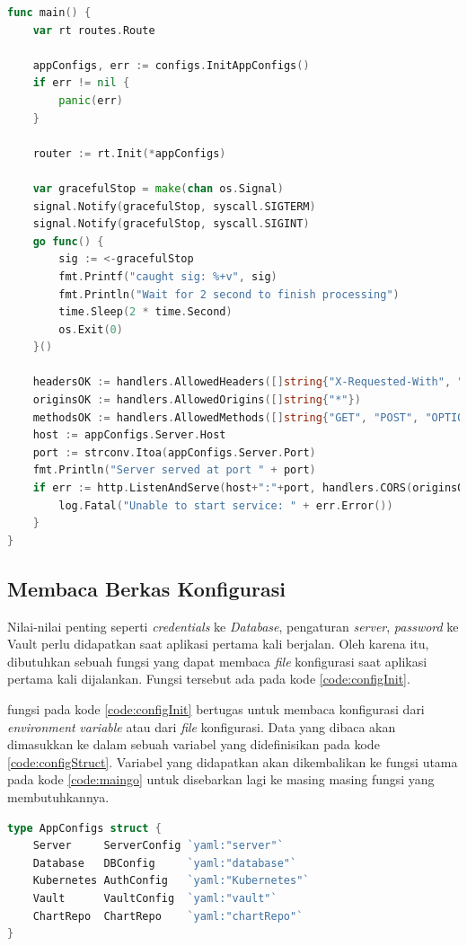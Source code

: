 \begin{lstlisting}[frame=single,language=Go,caption={Kode utama pada aplikasi yang dikembangkan},label={code:maingo}]
func main() {
	var rt routes.Route

	appConfigs, err := configs.InitAppConfigs()
	if err != nil {
		panic(err)
	}

	router := rt.Init(*appConfigs)

	var gracefulStop = make(chan os.Signal)
	signal.Notify(gracefulStop, syscall.SIGTERM)
	signal.Notify(gracefulStop, syscall.SIGINT)
	go func() {
		sig := <-gracefulStop
		fmt.Printf("caught sig: %+v", sig)
		fmt.Println("Wait for 2 second to finish processing")
		time.Sleep(2 * time.Second)
		os.Exit(0)
	}()

	headersOK := handlers.AllowedHeaders([]string{"X-Requested-With", "Content-Type", "NAME", "MODULE_NAME", "VERSION", "ON_FAILURE"})
	originsOK := handlers.AllowedOrigins([]string{"*"})
	methodsOK := handlers.AllowedMethods([]string{"GET", "POST", "OPTIONS", "DELETE", "PUT"})
	host := appConfigs.Server.Host
	port := strconv.Itoa(appConfigs.Server.Port)
	fmt.Println("Server served at port " + port)
	if err := http.ListenAndServe(host+":"+port, handlers.CORS(originsOK, headersOK, methodsOK)(router)); err != nil {
		log.Fatal("Unable to start service: " + err.Error())
	}
}
\end{lstlisting}

\subsection{Membaca Berkas Konfigurasi}
\label{sec:readConfig}
Nilai-nilai penting seperti \textit{credentials} ke \textit{Database}, pengaturan \textit{server}, \textit{password} ke Vault perlu didapatkan saat aplikasi pertama kali berjalan. Oleh karena itu, dibutuhkan sebuah fungsi yang dapat membaca \textit{file} konfigurasi saat aplikasi pertama kali dijalankan. Fungsi tersebut ada pada kode \ref{code:configInit}.

fungsi  pada kode \ref{code:configInit} bertugas untuk membaca konfigurasi dari \textit{environment} \textit{variable} atau dari \textit{file} konfigurasi. Data yang dibaca akan dimasukkan ke dalam sebuah variabel yang didefinisikan pada kode \ref{code:configStruct}. Variabel yang didapatkan akan dikembalikan ke fungsi utama pada kode \ref{code:maingo} untuk disebarkan lagi ke masing masing fungsi yang membutuhkannya.

\begin{lstlisting}[frame=single,language=Go,caption={\textit{Struct} yang berisi definisi variabel konfigurasi aplikasi},label={code:configStruct}]
type AppConfigs struct {
	Server     ServerConfig `yaml:"server"`
	Database   DBConfig     `yaml:"database"`
	Kubernetes AuthConfig   `yaml:"Kubernetes"`
	Vault      VaultConfig  `yaml:"vault"`
	ChartRepo  ChartRepo    `yaml:"chartRepo"`
}
\end{lstlisting}

